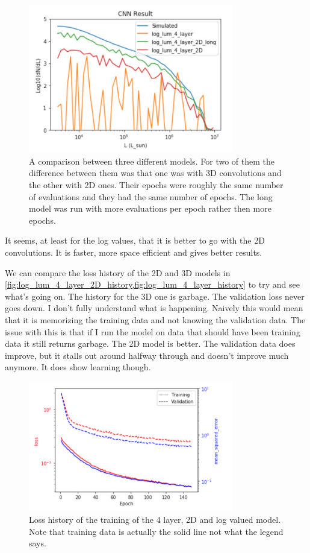 \documentclass{article}
\begin{document}
			\begin{figure}[H]
				\centering
				\includegraphics[width=0.8\textwidth]{2d_vs_3d.pdf}
				\caption{A comparison between three different models.  For two of them the difference between them was that one was with 3D convolutions and the other with 2D ones.  Their epochs were roughly the same number of evaluations and they had the same number of epochs.  The long model was run with more evaluations per epoch rather then more epochs.}
				\label{fig:2d_vs_3d}
			\end{figure}

			It seems, at least for the log values, that it is better to go with the 2D convolutions.  It is faster, more space efficient and gives better results.

			We can compare the loss history of the 2D and 3D models in \cref{fig:log_lum_4_layer_2D_history,fig:log_lum_4_layer_history} to try and see what's going on.  The history for the 3D one is garbage.  The validation loss never goes down.  I don't fully understand what is happening.  Naively this would mean that it is memorizing the training data and not knowing the validation data.  The issue with this is that if I run the model on data that should have been training data it still returns garbage.  The 2D model is better.  The validation data does improve, but it stalls out around halfway through and doesn't improve much anymore.  It does show learning though.

			\begin{figure}[H]
				\centering
				\includegraphics[width=0.8\textwidth]{log_lum_4_layer_2D_history.pdf}
				\caption{Loss history of the training of the 4 layer, 2D and log valued model.  Note that training data is actually the solid line not what the legend says.}
				\label{fig:log_lum_4_layer_2D_history}
			\end{figure}
\end{document}
